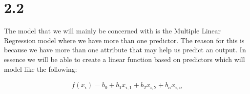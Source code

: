 \documentclass[12pt]{report}
\begin{document}
\section{2.2}

The model that we will mainly be concerned with is the Multiple Linear Regression model where we have more than one predictor. The reason for this is because we have more than one attribute that may help us predict an output. In essence we will be able to create a linear function based on predictors which will model like the following:

\begin{ceqn}
\begin{align*}
	f(x_{i}) = b_{0} + b_{1}x_{i,1} + b_{2}x_{i,2} + b_{n}x_{i,n}
\end{align*}
\end{ceqn}


\newpage
\end{document}
